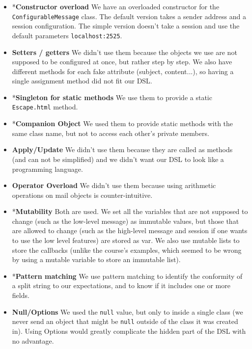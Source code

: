 \documentclass[10pt,a4paper]{article}
\begin{document}
	\begin{itemize}
		\item *\textbf{Constructor overload} We have an overloaded constructor for the \texttt{ConfigurableMessage} class. The default version takes a sender address and a session configuration. The simple version doesn't take a session and use the default parameters \texttt{localhost:2525}.
		
		\item \textbf{Setters / getters} We didn't use them because the objects we use are not supposed to be configured at once, but rather step by step. We also have different methods for each fake attribute (subject, content...), so having a single assignment method did not fit our DSL.
		
		\item *\textbf{Singleton for static methods} We use them to provide a static \texttt{Escape.html} method.
		
		\item *\textbf{Companion Object} We used them to provide static methods with the same class name, but not to access each other's private members.
		
		\item \textbf{Apply/Update} We didn't use them because they are called as methods (and can not be simplified) and we didn't want our DSL to look like a programming language.
		
		\item \textbf{Operator Overload} We didn't use them because using arithmetic operations on mail objects is counter-intuitive.
		
		\item *\textbf{Mutability} Both are used. We set all the variables that are not supposed to change (such as the low-level message) as immutable values, but those that are allowed to change (such as the high-level message and session if one wants to use the low level features) are stored as var. We also use mutable lists to store the callbacks (unlike the course's examples, which seemed to be wrong by using a mutable variable to store an immutable list).
		
		\item *\textbf{Pattern matching} We use pattern matching to identify the conformity of a split string to our expectations, and to know if it includes one or more fields.
		
		\item \textbf{Null/Options} We used the \texttt{null} value, but only to inside a single class (we never send an object that might be \texttt{null} outside of the class it was created in). Using Options would greatly complicate the hidden part of the DSL with no advantage.
		

\end{itemize}
\end{document}
